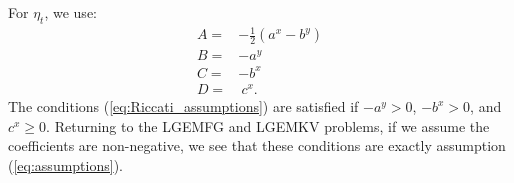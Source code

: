\documentclass[11pt]{article}
\begin{document}
\begin{appendices}
For $\eta_t$, we use:
\begin{equation*}
	\begin{array}{rl}
		A=&-\frac{1}{2}(a^x-b^y) \\
		B=&-a^y \\
		C=&-b^x \\
		D=&\ c^x.
	\end{array}
\end{equation*}
The conditions (\ref{eq:Riccati_assumptions}) are satisfied if $-a^y>0$, $-b^x>0$, and $c^x \geq0$. Returning to the LGEMFG and LGEMKV problems, if we assume the coefficients are non-negative, we see that these conditions are exactly assumption (\ref{eq:assumptions}).

\end{appendices}
\end{document}
